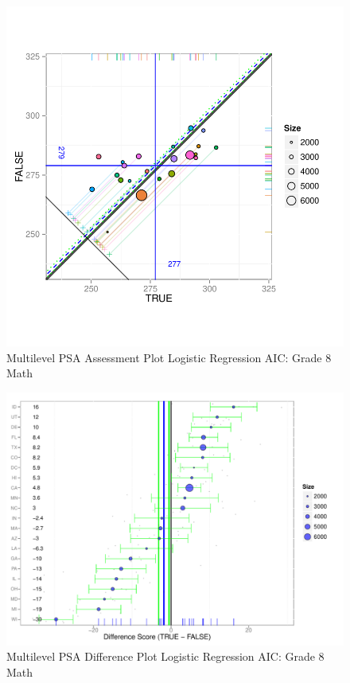 \documentclass[letterpaper,12p,twoside]{article} %
\begin{document}
\begin{figure}[h!]
\begin{center}
\includegraphics[width=\textwidth]{../Figures2009/g8math-mlpsa-lrAIC-circ.pdf}
\caption{Multilevel PSA Assessment Plot Logistic Regression AIC: Grade 8 Math}
\end{center}
\end{figure}

\begin{figure}[h!]
\begin{center}
\includegraphics[width=\textwidth]{../Figures2009/g8math-mlpsa-lrAIC-diff.pdf}
\caption{Multilevel PSA Difference Plot Logistic Regression AIC: Grade 8 Math}
\end{center}
\end{figure}
\end{document}
